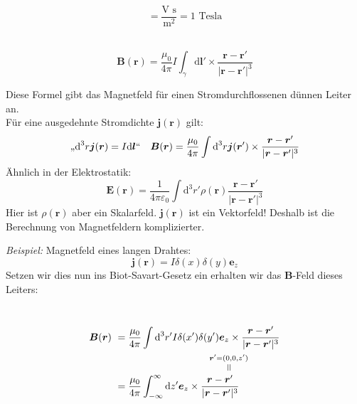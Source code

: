 \documentclass[titlepage,11pt,a4paper,ngerman]{report}
\newcommand{\tx}[1]{\textrm{#1}}
\newcommand{\dd}{\tx{d}}
\newcommand{\verteq}{\rotatebox{90}{$\,=$}}
\newcommand{\equaltoup}[2]{\overset{\scriptstyle\underset{\mkern4mu\verteq}{#2}}{#1}}
\renewcommand{\vec}[1]{\boldsymbol{#1}}
\renewcommand{\epsilon}{\varepsilon}
\newcommand{\frbox}[2]{\begin{tcolorbox}[colback=white,colframe=red!75!black,fonttitle=\bfseries,title=#1]#2\end{tcolorbox}}
\begin{document}
\begin{equation*}
[\vec{B}] = \frac{\tx{V s}}{\tx{m}^2} = 1 \tx{ Tesla}
\end{equation*}\\[5pt]
\frbox{Biot-Savart-Gesetz}{
\begin{equation*}
\vec{B}(\vec{r}) = \frac{\mu_0}{4 \pi} I \int_{\gamma} \dd \vec{l}' \times \frac{\vec{r} - \vec{r}'}{|\vec{r} - \vec{r}'|^3}
\end{equation*}
}
\noindent
Diese Formel gibt das Magnetfeld für einen Stromdurchflossenen dünnen Leiter an.\\[5pt]
Für eine ausgedehnte Stromdichte $ \vec{j}(\vec{r}) $ gilt:
\begin{equation*}
\tx{,,} \dd^3 r \vec{j}(\vec{r}) = I \dd \vec{l}`` \quad \vec{B}(\vec{r}) = \frac{\mu_0}{4 \pi} \int \dd^3 r \vec{j}(\vec{r}') \times \frac{\vec{r}- \vec{r}'}{|\vec{r} - \vec{r}'|^3}
\end{equation*}
Ähnlich in der Elektrostatik:
\begin{equation*}
\vec{E}(\vec{r}) = \frac{1}{4 \pi \epsilon_0} \int \dd^3 r' \rho(\vec{r}) \frac{\vec{r} - \vec{r}'}{|\vec{r} - \vec{r}'|^3}
\end{equation*}
Hier ist $ \rho(\vec{r}) $ aber ein Skalarfeld. $ \vec{j}(\vec{r}) $ ist ein Vektorfeld! Deshalb ist die Berechnung von Magnetfeldern komplizierter.\\[5pt]
\begin{minipage}{.7\linewidth}
	\emph{Beispiel:} Magnetfeld eines langen Drahtes:
	\begin{equation*}
	\vec{j}(\vec{r}) = I \delta(x) \delta(y) \vec{e}_z
	\end{equation*}
	Setzen wir dies nun ins Biot-Savart-Gesetz ein erhalten wir das $ \vec{B} $-Feld dieses Leiters:
\end{minipage}%
\begin{minipage}{.3\linewidth}
	\centering
\end{minipage}%
\\
\begin{align*}
\vec{B}(\vec{r}) \ &= \frac{\mu_0}{4 \pi} \int \dd^3 r' I \delta (x') \delta (y') \vec{e}_z \times \frac{\vec{r} - \vec{r}'}{|\vec{r} - \vec{r}'|^3}\\
&= \frac{\mu_0}{4 \pi} \int_{-\infty}^{\infty} \dd z' \vec{e}_z \times \frac{\vec{r} - \equaltoup{\vec{r}'}{\mathclap{\vec{r}' = (0,0,z')}}}{|\vec{r} - \vec{r}'|^3}\\
\end{align*}
\end{document}
